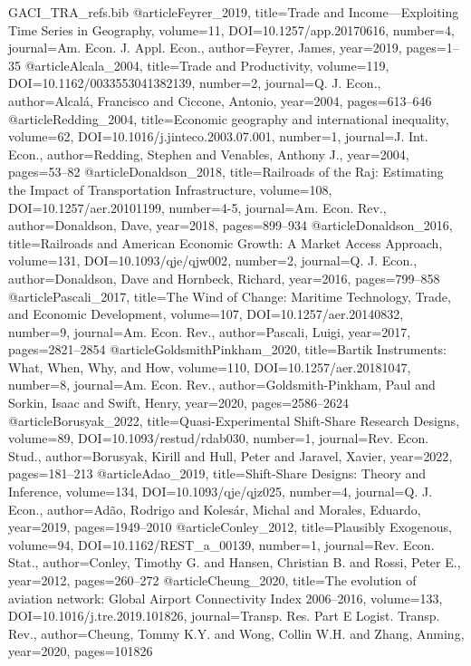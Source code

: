 \begin{filecontents*}[overwrite]{GACI_TRA_refs.bib}
@article{Feyrer_2019, title={Trade and Income---{Exploiting} Time Series in Geography}, volume={11}, DOI={10.1257/app.20170616}, number={4}, journal={Am. Econ. J. Appl. Econ.}, author={Feyrer, James}, year={2019}, pages={1--35} }
@article{Alcala_2004, title={Trade and Productivity}, volume={119}, DOI={10.1162/0033553041382139}, number={2}, journal={Q. J. Econ.}, author={Alcal\'a, Francisco and Ciccone, Antonio}, year={2004}, pages={613--646} }
@article{Redding_2004, title={Economic geography and international inequality}, volume={62}, DOI={10.1016/j.jinteco.2003.07.001}, number={1}, journal={J. Int. Econ.}, author={Redding, Stephen and Venables, Anthony J.}, year={2004}, pages={53--82} }
@article{Donaldson_2018, title={Railroads of the {Raj}: Estimating the Impact of Transportation Infrastructure}, volume={108}, DOI={10.1257/aer.20101199}, number={4-5}, journal={Am. Econ. Rev.}, author={Donaldson, Dave}, year={2018}, pages={899--934} }
@article{Donaldson_2016, title={Railroads and {American} Economic Growth: A Market Access Approach}, volume={131}, DOI={10.1093/qje/qjw002}, number={2}, journal={Q. J. Econ.}, author={Donaldson, Dave and Hornbeck, Richard}, year={2016}, pages={799--858} }
@article{Pascali_2017, title={The Wind of Change: Maritime Technology, Trade, and Economic Development}, volume={107}, DOI={10.1257/aer.20140832}, number={9}, journal={Am. Econ. Rev.}, author={Pascali, Luigi}, year={2017}, pages={2821--2854} }
@article{GoldsmithPinkham_2020, title={{Bartik} Instruments: What, When, Why, and How}, volume={110}, DOI={10.1257/aer.20181047}, number={8}, journal={Am. Econ. Rev.}, author={Goldsmith-Pinkham, Paul and Sorkin, Isaac and Swift, Henry}, year={2020}, pages={2586--2624} }
@article{Borusyak_2022, title={Quasi-Experimental Shift-Share Research Designs}, volume={89}, DOI={10.1093/restud/rdab030}, number={1}, journal={Rev. Econ. Stud.}, author={Borusyak, Kirill and Hull, Peter and Jaravel, Xavier}, year={2022}, pages={181--213} }
@article{Adao_2019, title={Shift-Share Designs: Theory and Inference}, volume={134}, DOI={10.1093/qje/qjz025}, number={4}, journal={Q. J. Econ.}, author={Ad\~ao, Rodrigo and Koles\'ar, Michal and Morales, Eduardo}, year={2019}, pages={1949--2010} }
@article{Conley_2012, title={Plausibly Exogenous}, volume={94}, DOI={10.1162/REST_a_00139}, number={1}, journal={Rev. Econ. Stat.}, author={Conley, Timothy G. and Hansen, Christian B. and Rossi, Peter E.}, year={2012}, pages={260--272} }
@article{Cheung_2020, title={The evolution of aviation network: {Global Airport Connectivity Index} 2006--2016}, volume={133}, DOI={10.1016/j.tre.2019.101826}, journal={Transp. Res. Part E Logist. Transp. Rev.}, author={Cheung, Tommy K.Y. and Wong, Collin W.H. and Zhang, Anming}, year={2020}, pages={101826} }

\end{filecontents*}
